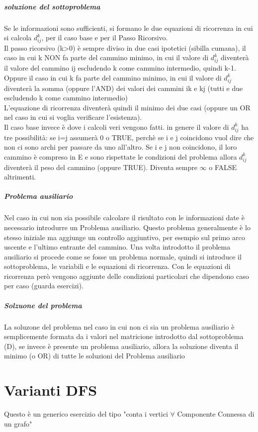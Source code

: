 \documentclass[12pt, a4paper, openany]{book}
\begin{document}
\subparagraph{soluzione del sottoproblema}
Se le informazioni sono sufficienti, si formano le due equazioni di ricorrenza in cui si calcola $d^k_{ij}$, per il caso base e per il Passo Ricorsivo.
\\Il passo ricorsivo (k>0) è sempre diviso in due casi ipotetici (sibilla cumana), il caso in cui k NON fa parte del cammino minimo, in cui il valore di $d^k_{ij}$ diventerà
il valore del cammino ij escludendo k come cammino intermedio, quindi k-1.\\Oppure il caso in cui k fa parte del cammino minimo, in cui il valore di $d^k_{ij}$ diventerà la somma (oppure l'AND) dei valori dei cammini ik e kj (tutti e due escludendo k come cammino intermedio)
\\L'equazione di ricorrenza diventerà quindi il minimo dei due casi (oppure un OR nel caso in cui si voglia verificare l'esistenza).\\
Il caso base invece è dove i calcoli veri vengono fatti. in genere il valore di $d^k_{ij}$ ha tre possibilità: se i=j assumerà 0 o TRUE, perchè se i e j coincidono vuol dire che non ci sono archi per passare da uno all'altro.
Se i e j non coincidono, il loro cammino è compreso in E e sono rispettate le condizioni del problema allora $d^k_{ij}$ diventerà il peso del cammino (oppure TRUE). Diventa sempre $\infty$ o FALSE altrimenti.


\subparagraph{Problema ausiliario} Nel caso in cui non sia possibile calcolare il risultato con le informazioni date è necessario introdurre un Problema ausiliario.
Questo problema generalmente è lo stesso iniziale ma aggiunge un controllo aggiuntivo, per esempio sul primo arco uscente e l'ultimo entrante del cammino.
Una volta introdotto il problema ausiliario si procede come se fosse un problema normale, quindi si introduce il sottoproblema, le variabili e le equazioni di ricorrenza.
Con le equazioni di ricorrenza però vengono aggiunte delle condizioni particolari che dipendono caso per caso (guarda esercizi).

\subparagraph{Solzuone del problema} La soluzone del problema nel caso in cui non ci sia un problema ausiliario è semplicemente formata da i valori nel matricione introdotto dal sottoproblema (D),
se invece è presente un problema ausiliario, allora la soluzione diventa il minimo (o OR) di tutte le soluzioni del Problema ausiliario

\section{Varianti DFS}
Questo è un generico esercizio del tipo "conta i vertici $\forall$ Componente Connessa di un grafo"
\end{document}
